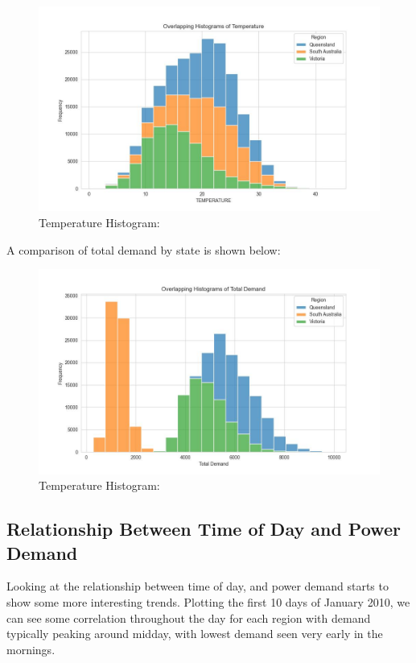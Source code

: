 \documentclass[
]{article}
\begin{document}
\begin{figure}
\centering
\includegraphics{img/Hist_Temperature.jpg}
\caption{Temperature Histogram:}
\end{figure}

A comparison of total demand by state is shown below:

\begin{figure}
\centering
\includegraphics{img/Hist_TotalDemand.jpg}
\caption{Temperature Histogram:}
\end{figure}

\subsection{Relationship Between Time of Day and Power
Demand}\label{relationship-between-time-of-day-and-power-demand}

Looking at the relationship between time of day, and power demand starts
to show some more interesting trends. Plotting the first 10 days of
January 2010, we can see some correlation throughout the day for each
region with demand typically peaking around midday, with lowest demand
seen very early in the mornings.
\end{document}
